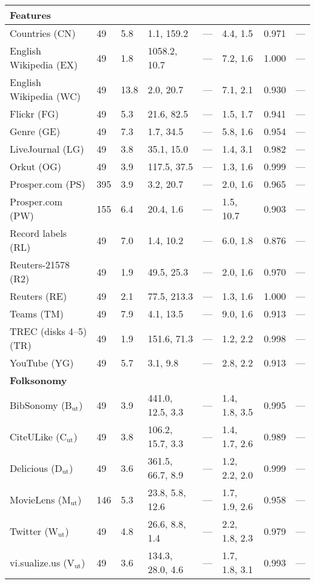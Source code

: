 \begin{longtable}{ llllllll }
\hline
\multicolumn{8}{|l|}{\textbf{Features}} \\
\hline
Countries (\textsf{CN})           & 49 & 5.8 & 1.1, 159.2 & --- & 4.4, 1.5 & 0.971 & --- \\
English Wikipedia (\textsf{EX})   & 49 & 1.8 & 1058.2, 10.7 & --- & 7.2, 1.6 & 1.000 & --- \\
English Wikipedia (\textsf{WC})   & 49 & 13.8 & 2.0, 20.7 & --- & 7.1, 2.1 & 0.930 & --- \\
Flickr (\textsf{FG})              & 49 & 5.3 & 21.6, 82.5 & --- & 1.5, 1.7 & 0.941 & --- \\
Genre (\textsf{GE})               & 49 & 7.3 & 1.7, 34.5 & --- & 5.8, 1.6 & 0.954 & --- \\
LiveJournal (\textsf{LG})         & 49 & 3.8 & 35.1, 15.0 & --- & 1.4, 3.1 & 0.982 & --- \\
Orkut (\textsf{OG})               & 49 & 3.9 & 117.5, 37.5 & --- & 1.3, 1.6 & 0.999 & --- \\
Prosper.com (\textsf{PS})         & 395 & 3.9 & 3.2, 20.7 & --- & 2.0, 1.6 & 0.965 & --- \\
Prosper.com (\textsf{PW})         & 155 & 6.4 & 20.4, 1.6 & --- & 1.5, 10.7 & 0.903 & --- \\
Record labels (\textsf{RL})       & 49 & 7.0 & 1.4, 10.2 & --- & 6.0, 1.8 & 0.876 & --- \\
Reuters-21578 (\textsf{R2})       & 49 & 1.9 & 49.5, 25.3 & --- & 2.0, 1.6 & 0.970 & --- \\
Reuters (\textsf{RE})             & 49 & 2.1 & 77.5, 213.3 & --- & 1.3, 1.6 & 1.000 & --- \\
Teams (\textsf{TM})               & 49 & 7.9 & 4.1, 13.5 & --- & 9.0, 1.6 & 0.913 & --- \\
TREC (disks 4--5) (\textsf{TR})   & 49 & 1.9 & 151.6, 71.3 & --- & 1.2, 2.2 & 0.998 & --- \\
YouTube (\textsf{YG})             & 49 & 5.7 & 3.1, 9.8 & --- & 2.8, 2.2 & 0.913 & --- \\

\hline
\multicolumn{8}{|l|}{\textbf{Folksonomy}} \\
\hline
BibSonomy (\textsf{B\ensuremath{_{\textrm{ut}}}})       & 49 & 3.9 & 441.0, 12.5, 3.3 & --- & 1.4, 1.8, 3.5 & 0.995 & --- \\
CiteULike (\textsf{C\ensuremath{_{\textrm{ut}}}})       & 49 & 3.8 & 106.2, 15.7, 3.3 & --- & 1.4, 1.7, 2.6 & 0.989 & --- \\
Delicious (\textsf{D\ensuremath{_{\textrm{ut}}}})       & 49 & 3.6 & 361.5, 66.7, 8.9 & --- & 1.2, 2.2, 2.0 & 0.999 & --- \\
MovieLens (\textsf{M\ensuremath{_{\textrm{ut}}}})       & 146 & 5.3 & 23.8, 5.8, 12.6 & --- & 1.7, 1.9, 2.6 & 0.958 & --- \\
Twitter (\textsf{W\ensuremath{_{\textrm{ut}}}})         & 49 & 4.8 & 26.6, 8.8, 1.4 & --- & 2.2, 1.8, 2.3 & 0.979 & --- \\
vi.sualize.us (\textsf{V\ensuremath{_{\textrm{ut}}}})   & 49 & 3.6 & 134.3, 28.0, 4.6 & --- & 1.7, 1.8, 3.1 & 0.993 & --- \\


\end{longtable}
